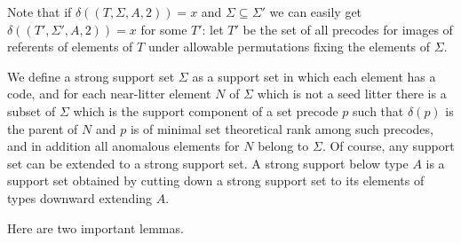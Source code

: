 \documentclass{article}
\begin{document}
Note that  if $\delta((T,\Sigma,A,2))=x$ and $\Sigma \subseteq \Sigma'$ we can easily get $\delta((T',\Sigma',A,2))=x$ for some $T'$:  let $T'$ be the set of all precodes for
images of referents of elements of $T$ under allowable permutations fixing the elements of $\Sigma$.

We define a strong support set $\Sigma$ as a support set in which each element has a code, and for each near-litter element $N$ of $\Sigma$  which is not a seed litter there is a subset of $\Sigma$ which is the support component of a set precode $p$ such that $\delta(p)$ is the parent of $N$ and $p$ is of minimal set theoretical rank among such precodes, and in addition all anomalous elements for $N$ belong to $\Sigma$.   Of course, any support set can be extended to a strong support set.  A strong support below type $A$ is a support set obtained by cutting down a strong support set to its elements of types downward extending $A$.

Here are two important lemmas.
\end{document}
